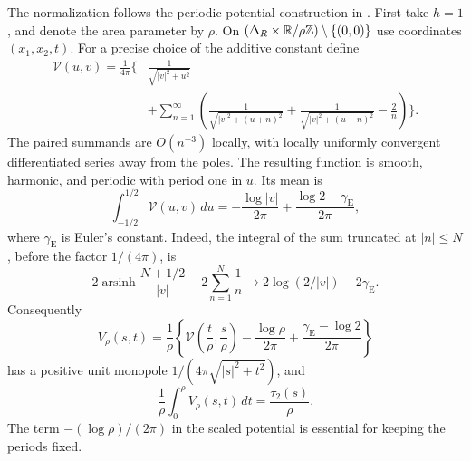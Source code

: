 The normalization follows the periodic-potential construction in
\cite[Lemma~3.1 and Proposition~3.2]{GrossWilson2000}.
First take \(h=1\), and denote the area parameter by \(\rho\).
On \((\Delta_R\times\mathbb R/\rho\mathbb Z)\setminus\{(0,0)\}\) use coordinates
\((x_1,x_2,t)\).
For a precise choice of the additive constant define
\begin{equation}\label{eq:nodal-unit-potential}
\begin{split}
 \mathcal V(u,v)=\frac{1}{4\pi}\bigg\{
 &\frac{1}{\sqrt{|v|^2+u^2}}\\
 &+\sum_{n=1}^\infty
 \left(\frac{1}{\sqrt{|v|^2+(u+n)^2}}+
       \frac{1}{\sqrt{|v|^2+(u-n)^2}}-\frac2n\right)\bigg\}.
\end{split}
\end{equation}
The paired summands are \(O(n^{-3})\) locally, with locally uniformly
convergent differentiated series away from the poles.  The resulting
function is smooth, harmonic, and periodic with period one in \(u\).
Its mean is
\begin{equation}\label{eq:nodal-unit-mean}
 \int_{-1/2}^{1/2}\mathcal V(u,v)\,du
  =-\frac{\log|v|}{2\pi}
       +\frac{\log2-\gamma_{\mathrm E}}{2\pi},
\end{equation}
where \(\gamma_{\mathrm E}\) is Euler's constant.  Indeed, the integral
of the sum truncated at \(|n|\le N\), before the factor \(1/(4\pi)\),
is
\[
 2\operatorname{arsinh}\frac{N+1/2}{|v|}
      -2\sum_{n=1}^N\frac1n
 \longrightarrow 2\log(2/|v|)-2\gamma_{\mathrm E}.
\]
Consequently
\begin{equation}\label{eq:nodal-scaled-potential}
 V_\rho(s,t)=\frac1\rho
 \left\{\mathcal V\left(\frac t\rho,\frac s\rho\right)
       -\frac{\log\rho}{2\pi}
       +\frac{\gamma_{\mathrm E}-\log2}{2\pi}\right\}
\end{equation}
has a positive unit monopole \(1/(4\pi\sqrt{|s|^2+t^2})\), and
\begin{equation}\label{eq:nodal-mean}
 \frac1\rho\int_0^\rho V_\rho(s,t)\,dt
       =\frac{\tau_2(s)}{\rho}.
\end{equation}
The term \(-(\log\rho)/(2\pi)\) in the scaled potential is essential
for keeping the periods fixed.

